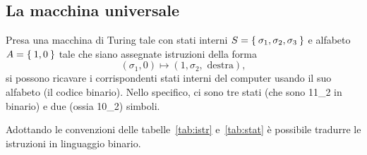 		\subsection{La macchina universale}
Presa una macchina di Turing tale con stati interni $S=\Set{\sigma_1, \sigma_2, \sigma_3}$ e alfabeto $A=\Set{1, 0}$ tale che siano assegnate istruzioni della forma
\begin{equation}\label{eq:istruzione}
(\sigma_1, 0) \mapsto (1, \sigma_2, \text{ destra}),	%
\end{equation}
si possono ricavare i corrispondenti stati interni del computer usando il suo alfabeto (il codice binario).
Nello specifico, ci sono tre stati  (che sono \num[parse-numbers=false]{11_2} in binario) e due (ossia \num[parse-numbers=false]{10_2}) simboli.
\begin{table}
	\centering
{}\quad
\subfloat[][{\em Rappresentazione binaria degli stati interni.}\label{tab:stat}]{%
	\begin{tabular}{l S[parse-numbers=false]}
		\toprule
\emph{Stato}			&{\emph{Numero}}	\\
		\midrule
$\sigma_1$				&01	\\
$\sigma_2$				&10	\\
$\sigma_3$				&11	\\
		\bottomrule
	\end{tabular}
}
	\caption[Macchina di Turing]{Convenzioni binarie per la macchina di Turing.}
\end{table}
Adottando le convenzioni delle tabelle~\ref{tab:istr} e~\ref{tab:stat} è possibile tradurre le istruzioni in linguaggio binario.
